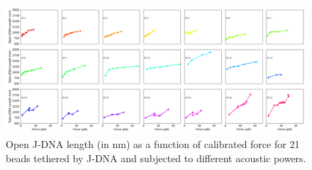 \documentclass{biophys-new}
\begin{document}
\begin{figure}
	\centering
	\centerline {\includegraphics[width=1\linewidth]{Figures/Force_Lengths_Bis_Rapa.png}}
	\caption{Open J-DNA length (in nm) as a function of calibrated force for 21 beads tethered by J-DNA and subjected to different acoustic powers.
	}
	\label{fig:ForceLength}	
\end{figure}


\end{document}
